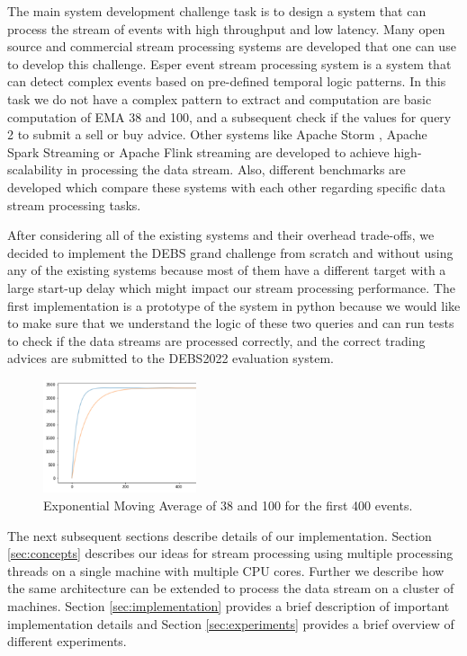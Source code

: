 The main system development challenge task is to design a system that can process the stream of events with high throughput and low latency. 
Many open source and commercial stream processing systems are developed that one can use to develop this challenge. 
Esper event stream processing system \cite{Bernhardt2007} is a system that can detect complex events based on pre-defined temporal logic patterns. 
In this task we do not have a complex pattern to extract and computation are basic computation of EMA 38 and 100, and a subsequent check if the values for 
query 2 to submit a sell or buy advice. Other systems like Apache Storm \cite{8288619}, Apache Spark Streaming \cite{zaharia2010spark} or 
Apache Flink streaming \cite{alexandrov2014stratosphere} are developed to achieve high-scalability in processing the data stream. 
Also, different benchmarks are developed  \cite{8701904} which compare these systems with each other regarding specific data 
stream processing tasks. 

After considering all of the existing systems and their overhead trade-offs, we decided to implement the DEBS grand challenge from scratch and 
without using any of the existing systems because most of them have a different target with a large start-up delay which might impact 
our stream processing performance. The first implementation is a prototype of the system in python because we would like to make sure 
that we understand the logic of these two queries and can run tests to check if the data streams are processed correctly, and the correct 
trading advices are submitted to the DEBS2022 evaluation system. 



\begin{figure}[!ht]
    \begin{center}
        \includegraphics[width=0.4\textwidth]{./images/query2_example_200.png}
        \caption{Exponential Moving Average of 38 and 100 for the first 400 events.}
        \label{fig:EMA200}
    \end{center}
\end{figure}


The next subsequent sections describe details of our implementation. Section \ref{sec:concepts} describes our ideas for 
stream processing using multiple processing threads on a single machine with multiple CPU cores. Further we describe how the same 
architecture can be extended to process the data stream on a cluster of machines.  Section \ref{sec:implementation} provides 
a brief description of important implementation details and Section \ref{sec:experiments} provides a brief overview of different 
experiments.